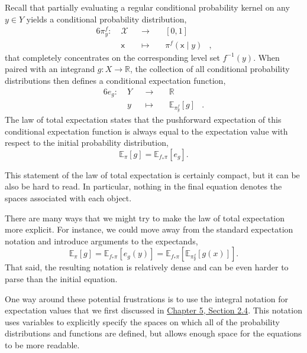 \documentclass[
  letterpaper,
  DIV=11,
  numbers=noendperiod]{scrartcl}
\begin{document}
Recall that partially evaluating a regular conditional probability
kernel on any \(y \in Y\) yields a conditional probability distribution,
\begin{alignat*}{6}
\pi^{f}_{y} :\; &\mathcal{X}& &\rightarrow& \; &[0, 1]&
\\
&\mathsf{x}& &\mapsto& &\pi^{f}( \mathsf{x} \mid y )&,
\end{alignat*} that completely concentrates on the corresponding level
set \(f^{-1}(y)\). When paired with an integrand
\(g : X \rightarrow \mathbb{R}\), the collection of all conditional
probability distributions then defines a conditional expectation
function, \begin{alignat*}{6}
e_{g} : \; &Y& &\rightarrow& \; &\mathbb{R}&
\\
&y& &\mapsto& & \mathbb{E}_{ \pi^{f}_{y} } \! \left[  g  \right]&.
\end{alignat*} The law of total expectation states that the pushforward
expectation of this conditional expectation function is always equal to
the expectation value with respect to the initial probability
distribution, \[
\mathbb{E}_{\pi} \! \left[ g \right] = \mathbb{E}_{ f_{*} \pi } \! \left[ e_{g} \right].
\]

This statement of the law of total expectation is certainly compact, but
it can be also be hard to read. In particular, nothing in the final
equation denotes the spaces associated with each object.

There are many ways that we might try to make the law of total
expectation more explicit. For instance, we could move away from the
standard expectation notation and introduce arguments to the expectands,
\[
\mathbb{E}_{\pi} \! \left[ g \right]
= \mathbb{E}_{ f_{*} \pi } \! \left[ e_{g}(y)  \right]
= \mathbb{E}_{ f_{*} \pi } \! \left[  \mathbb{E}_{\pi^{f}_{y}} \! \left[ g(x) \right]  \right].
\] That said, the resulting notation is relatively dense and can be even
harder to parse than the initial equation.

One way around these potential frustrations is to use the integral
notation for expectation values that we first discussed in
\href{http://www.symplectomorphic.com/assets/chapters_html/expectation_values.html\#sec:alt_notations}{Chapter
5, Section 2.4}. This notation uses variables to explicitly specify the
spaces on which all of the probability distributions and functions are
defined, but allows enough space for the equations to be more readable.
\end{document}

